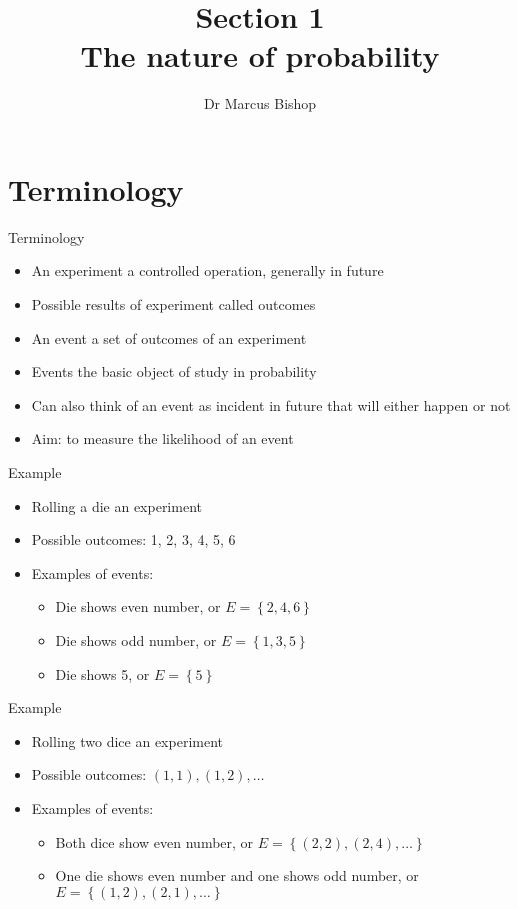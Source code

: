 \documentclass{beamer}
\title[\S1]{Section 1\\The nature of probability}
\author{Dr Marcus Bishop}
\theoremstyle{definition}
\begin{document}
\begin{frame}\titlepage\end{frame}
\LogoOff

\section{Terminology}
\begin{frame}{Terminology}
\begin{itemize}
\item An \alert{experiment} a controlled operation,
generally in future
\item Possible results of experiment called \alert{outcomes}
\item An \alert{event} a set of outcomes of an experiment
\item Events the basic object of study in probability
\item Can also think of an event as incident in future
that will either happen or not
\item Aim: to measure the likelihood of an event
\end{itemize}
\end{frame}

\begin{frame}{Example}
\begin{itemize}
\item Rolling a die an experiment
\item Possible outcomes: 1, 2, 3, 4, 5, 6
\item Examples of events:
\begin{itemize}
\item Die shows even number, or $E=\left\{2,4,6\right\}$
\item Die shows odd number, or $E=\left\{1,3,5\right\}$
\item Die shows 5, or $E=\left\{5\right\}$
\end{itemize}
\end{itemize}
\end{frame}

\begin{frame}{Example}
\begin{itemize}
\item Rolling \alert{two} dice an experiment
\item Possible outcomes: $\left(1,1\right),\left(1,2\right),\ldots$
\item Examples of events:
\begin{itemize}
\item Both dice show even number, or $E=\left\{\left(2,2\right),
\left(2,4\right),\ldots\right\}$
\item One die shows even number and one shows odd number,
or $E=\left\{\left(1,2\right),\left(2,1\right),\ldots\right\}$
\end{itemize}
\end{itemize}
\end{frame}
\end{document}
